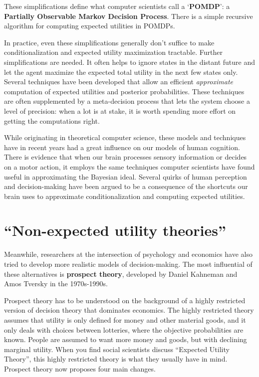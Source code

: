 These simplifications define what computer scientists call a `\textbf{POMDP}': a
\textbf{Partially Observable Markov Decision Process}. There is a simple
recursive algorithm for computing expected utilities in POMDPs.


In practice, even these simplifications generally don't suffice to make
conditionalization and expected utility maximization tractable. Further
simplifications are needed. It often helps to ignore states in the distant
future and let the agent maximize the expected total utility in the next few
states only. Several techniques have been developed that allow an efficient
\emph{approximate} computation of expected utilities and posterior
probabilities. These techniques are often supplemented by a meta-decision
process that lets the system choose a level of precision: when a lot is at
stake, it is worth spending more effort on getting the computations right.

While originating in theoretical computer science, these models and techniques
have in recent years had a great influence on our models of human cognition.
There is evidence that when our brain processes sensory information or decides
on a motor action, it employs the same techniques computer scientists have found
useful in approximating the Bayesian ideal. Several quirks of human perception
and decision-making have been argued to be a consequence of the shortcuts our
brain uses to approximate conditionalization and computing expected utilities.


\section{``Non-expected utility theories''}\label{sec:prospect-theory}

Meanwhile, researchers at the intersection of psychology and economics have also
tried to develop more realistic models of decision-making. The most influential
of these alternatives is \textbf{prospect theory}, developed by Daniel Kahneman
and Amos Tversky in the 1970s-1990s.

Prospect theory has to be understood on the background of a highly restricted
version of decision theory that dominates economics. The highly restricted
theory assumes that utility is only defined for money and other material goods,
and it only deals with choices between lotteries, where the objective
probabilities are known. People are assumed to want more money and goods, but
with declining marginal utility. When you find social scientists discuss
``Expected Utility Theory'', this highly restricted theory is what they usually
have in mind. Prospect theory now proposes four main changes.

